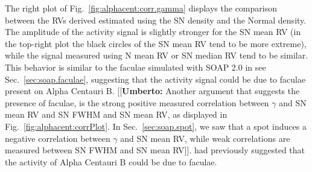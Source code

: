 \documentclass{aa}
\newcommand{\umberto}[1]{{\color{green}[[\textbf{Umberto: }#1]]}}
\begin{document}
The right plot of Fig.~\ref{fig:alphacent:corr.gamma} displays the comparison between the RVs derived estimated using the SN density and the Normal density. 
The amplitude of the activity signal is slightly stronger for the SN mean RV (in the top-right plot the black circles of the SN mean RV tend to be more extreme), while the signal measured using N mean RV or SN median RV tend to be similar. 
This behavior is similar to the faculae simulated with SOAP 2.0 in see Sec.~\ref{sec:soap.faculae}, suggesting that the activity signal could be due to faculae present on Alpha Centauri B. \umberto{Another argument that suggests the presence of faculae, is the strong positive measured correlation between $\gamma$ and SN mean RV and SN FWHM and SN mean RV, as displayed in Fig.~\ref{fig:alphacent:corrPlot}. In Sec.~\ref{sec:soap.spot}, we saw that a spot induces a negative correlation between $\gamma$ and SN mean RV, while weak correlations are measured between SN FWHM and SN mean RV}.
\citet{Dumusque-2014c} had previously suggested that the activity of Alpha Centauri B could be due to faculae.
%
\end{document}
